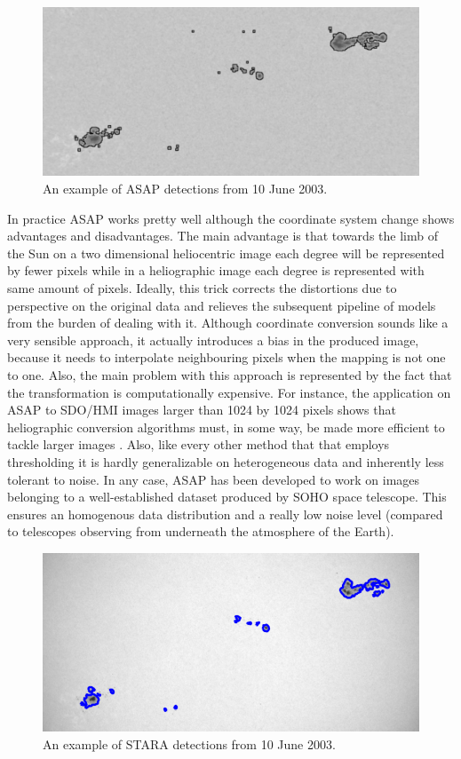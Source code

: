 \begin{figure}[t]
    \centering
    \includegraphics[width=\textwidth]{./pictures/asap-example-detection}
    \caption{An example of ASAP detections from 10 June 2003.}
    \label{fig:asap-example}
\end{figure}
In practice ASAP works pretty well \cite{verbeeck2013multi} although the coordinate system change shows advantages and disadvantages. The main advantage is that towards the limb of the Sun on a two dimensional heliocentric image each degree will be represented by fewer pixels while in a heliographic image each degree is represented with same amount of pixels. Ideally, this trick corrects the distortions due to perspective on the original data and relieves the subsequent pipeline of models from the burden of dealing with it. Although coordinate conversion sounds like a very sensible approach, it actually introduces a bias in the produced image, because it needs to interpolate neighbouring pixels when the mapping is not one to one. Also, the main problem with this approach is represented by the fact that the transformation is computationally expensive. For instance, the application on ASAP to SDO/HMI \cite{schou2012design} images larger than 1024 by 1024 pixels shows that heliographic conversion algorithms must, in some way, be made more efficient to tackle larger images \cite{verbeeck2013multi}. Also, like every other method that that employs thresholding it is hardly generalizable on heterogeneous data and inherently less tolerant to noise. In any case, ASAP has been developed to work on images belonging to a well-established dataset produced by SOHO space telescope. This ensures an homogenous data distribution and a really low noise level (compared to telescopes observing from underneath the atmosphere of the Earth). \\
\begin{figure}[t]
    \centering
    \includegraphics[width=\textwidth]{./pictures/stara-example-detection}
    \caption{An example of STARA detections from 10 June 2003.}
    \label{fig:stara-example}
\end{figure}
